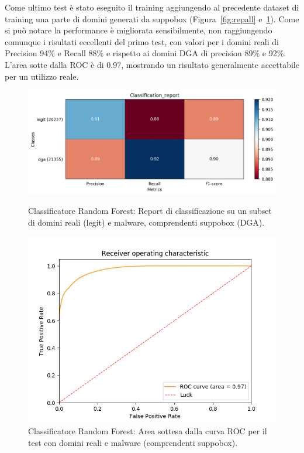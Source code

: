Come ultimo test è stato eseguito il training aggiungendo al precedente dataset di training una parte di domini generati da suppobox (Figura~\ref{fig:repall} e~\ref{fig:rocall}). Come si può notare la performance è migliorata sensibilmente, non raggiungendo comunque i risultati eccellenti del primo test, con valori per i domini reali di Precision 94\% e Recall 88\% e rispetto ai domini DGA di precision 89\% e 92\%.
L'area sotte dalla ROC è di 0.97, mostrando un risultato generalmente accettabile per un utilizzo reale.

\begin{figure}[!bp]
    \centering
    \includegraphics[width=\columnwidth]{figures/rndf_tra_sup_sup/class_rep.png}
    \caption{Classificatore Random Forest: Report di classificazione su un subset di domini reali (legit) e malware, comprendenti suppobox (DGA).\label{fig:repall}}
    \centering
    \includegraphics[width=\columnwidth]{figures/rndf_tra_sup_sup/roc_plot.png}
    \caption{Classificatore Random Forest: Area sottesa dalla curva ROC per il test con domini reali e malware (comprendenti suppobox).\label{fig:rocall}}
\end{figure}

